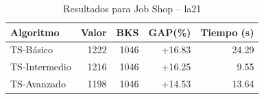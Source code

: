 \begin{table}[h]
\centering
\caption{Resultados para Job Shop -- la21}
\label{tab:jobshop_la21}
\begin{tabular}{lrrrr}
\hline
\textbf{Algoritmo} & \textbf{Valor} & \textbf{BKS} & \textbf{GAP(\%)} & \textbf{Tiempo (s)} \\
\hline
TS-Básico & 1222 & 1046 & +16.83 & 24.29 \\
TS-Intermedio & 1216 & 1046 & +16.25 & 9.55 \\
TS-Avanzado & 1198 & 1046 & +14.53 & 13.64 \\
\hline
\end{tabular}
\end{table}
